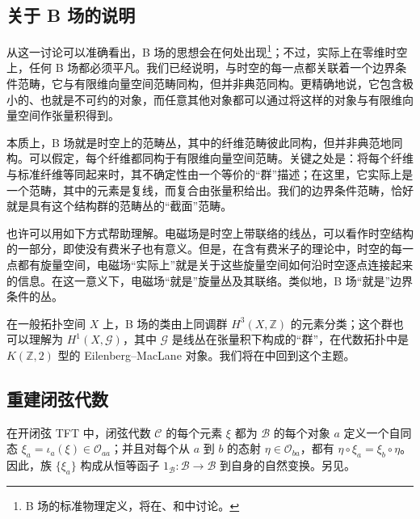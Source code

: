 \subsection{关于 B 场的说明}\label{sec:2.2.2}

从这一讨论可以准确看出，B 场的思想会在何处出现\footnote{B 场的标准物理定义，将在、和中讨论。}；不过，实际上在零维时空上，任何 B 场都必须平凡。我们已经说明，与时空的每一点都关联着一个边界条件范畴，它与有限维向量空间范畴同构，但并非典范同构。更精确地说，它包含极小的、也就是不可约的对象，而任意其他对象都可以通过将这样的对象与有限维向量空间作张量积得到。

本质上，B 场就是时空上的范畴丛，其中的纤维范畴彼此同构，但并非典范地同构。可以假定，每个纤维都同构于有限维向量空间范畴。关键之处是：将每个纤维与标准纤维等同起来时，其不确定性由一个等价的“群”描述；在这里，它实际上是一个范畴，其中的元素是复线，而复合由张量积给出。我们的边界条件范畴，恰好就是具有这个结构群的范畴丛的“截面”范畴。

也许可以用如下方式帮助理解。电磁场是时空上带联络的线丛，可以看作时空结构的一部分，即使没有费米子也有意义。但是，在含有费米子的理论中，时空的每一点都有旋量空间，电磁场“实际上”就是关于这些旋量空间如何沿时空逐点连接起来的信息。在这一意义下，电磁场“就是”旋量丛及其联络。类似地，B 场“就是”边界条件的丛。

在一般拓扑空间 $X$ 上，B 场的类由上同调群 $H^3(X,\mathbb{Z})$ 的元素分类；这个群也可以理解为 $H^1(X,\mathcal{G})$，其中 $\mathcal{G}$ 是线丛在张量积下构成的“群”，在代数拓扑中是 $K(\mathbb{Z},2)$ 型的 Eilenberg--MacLane 对象。我们将在中回到这个主题。

\subsection{重建闭弦代数}\label{sec:2.2.3}

在开闭弦 TFT 中，闭弦代数 $\mathcal{C}$ 的每个元素 $\xi$ 都为 $\mathcal{B}$ 的每个对象 $a$ 定义一个自同态 $\xi_a=\iota_a(\xi)\in\mathcal{O}_{aa}$；并且对每个从 $a$ 到 $b$ 的态射 $\eta\in\mathcal{O}_{ba}$，都有 $\eta\circ\xi_a=\xi_b\circ\eta$。因此，族 $\{\xi_a\}$ 构成从恒等函子 $1_{\mathcal{B}}\colon\mathcal{B}\to\mathcal{B}$ 到自身的自然变换。另见。


